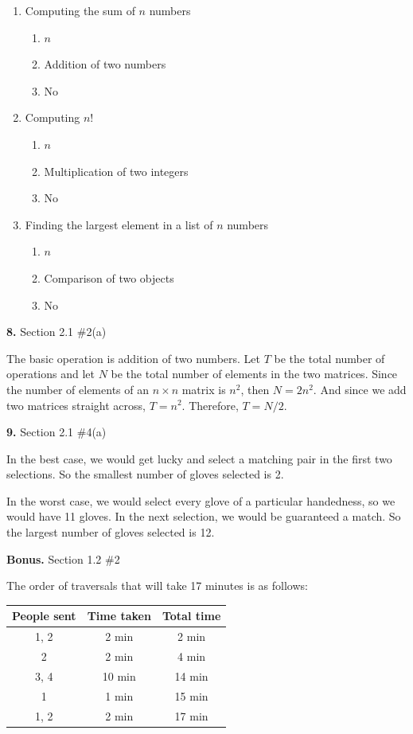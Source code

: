 \documentclass[letterpaper, 11pt]{article}
\newcommand{\hwnumber}[3]{\medskip \noindent\textbf{#1.} Section #2 \##3 \smallskip}
\begin{document}
\begin{enumerate}[label = (\alph*)]
  \item Computing the sum of $n$ numbers
    \begin{enumerate}[label=(\roman*)]
      \item $n$
      \item Addition of two numbers
      \item No
    \end{enumerate}
  \item Computing $n!$
    \begin{enumerate}[label=(\roman*)]
      \item $n$
      \item Multiplication of two integers
      \item No
    \end{enumerate}
  \item Finding the largest element in a list of $n$ numbers
    \begin{enumerate}[label=(\roman*)]
      \item $n$
      \item Comparison of two objects
      \item No
    \end{enumerate}
\end{enumerate}

\hwnumber{8}{2.1}{2(a)}

The basic operation is addition of two numbers. Let $T$ be the total number of
operations and let $N$ be the total number of elements in the two matrices.
Since the number of elements of an $n \times n$ matrix is $n^2$, then $N =
2n^2$. And since we add two matrices straight across, $T = n^2$. Therefore, $T =
N / 2$. 

\hwnumber{9}{2.1}{4(a)}

In the best case, we would get lucky and select a matching pair in the first two
selections. So the smallest number of gloves selected is 2. 

In the worst case, we would select every glove of a particular handedness, so we
would have 11 gloves. In the next selection, we would be guaranteed a match. So
the largest number of gloves selected is 12. 


\hwnumber{Bonus}{1.2}{2}

The order of traversals that will take 17 minutes is as follows:

\begin{center}
  \begin{tabular}{c | c | c}
    People sent & Time taken & Total time \\
    \hline
    1, 2 & 2 min & 2 min \\ 
    2 & 2 min & 4 min \\
    3, 4 & 10 min & 14 min \\
    1 & 1 min & 15 min \\
    1, 2 & 2 min & 17 min \\
  \end{tabular}
\end{center}
\end{document}
